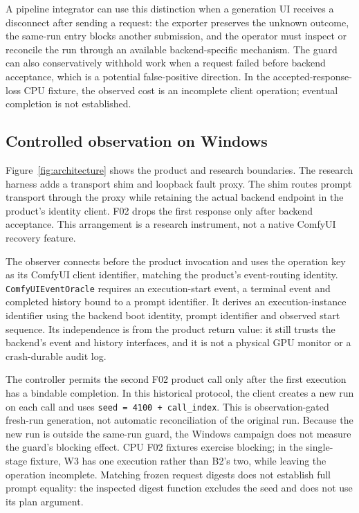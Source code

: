 \documentclass[conference,letterpaper,10pt]{IEEEtran}
\begin{document}
A pipeline integrator can use this distinction when a generation UI receives a
disconnect after sending a request: the exporter preserves the unknown outcome,
the same-run entry blocks another submission, and the operator must inspect or
reconcile the run through an available backend-specific mechanism. The guard can
also conservatively withhold work when a request failed before backend acceptance,
which is a potential false-positive direction. In the accepted-response-loss
CPU fixture, the observed cost is an incomplete client operation; eventual
completion is not established.


\subsection{Controlled observation on Windows}

Figure~\ref{fig:architecture} shows the product and research boundaries.
The research harness adds a transport shim and loopback fault proxy. The shim
routes prompt transport through the proxy while retaining the actual backend
endpoint in the product's identity client. F02 drops the first response only
after backend acceptance. This arrangement is a research instrument, not a
native ComfyUI recovery feature.

The observer connects before the product invocation and uses the operation key
as its ComfyUI client identifier, matching the product's event-routing identity.
\texttt{ComfyUIEventOracle} requires an execution-start event, a terminal event and
completed history bound to a prompt identifier. It derives an execution-instance
identifier using the backend boot identity, prompt identifier and observed
start sequence. Its independence is from the product return value: it still
trusts the backend's event and history interfaces, and it is not a physical GPU
monitor or a crash-durable audit log.

The controller permits the second F02 product call only after the first
execution has a bindable completion. In this historical protocol, the client creates a new run on each call
and uses \texttt{seed = 4100 + call\_index}. This is observation-gated fresh-run
generation, not automatic reconciliation of the original run. Because the new
run is outside the same-run guard, the Windows campaign does not measure the
guard's blocking effect. CPU F02 fixtures exercise blocking; in the single-stage
fixture, W3 has one execution rather than B2's two, while leaving the operation incomplete. Matching frozen
request digests does not establish full prompt equality: the inspected digest
function excludes the seed and does not use its plan argument.
\end{document}
